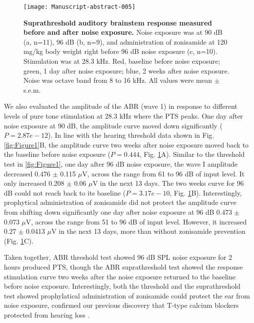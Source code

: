 \documentclass[11pt]{article}
\begin{document}
\begin{figure}[ht]
\centering
\texttt{[image: Manuscript-abstract-005]}

\caption{{\bf {Suprathreshold auditory brainstem response measured before and after noise exposure.}}  Noise exposure was at 90 dB (a, n=11), 96 dB (b, n=9), and administration of zonisamide at 120 mg/kg body weight right before 96 dB noise exposure (c, n=10). Stimulation was at 28.3 kHz.  Red, baseline before noise exposure; green, 1 day after noise exposure; blue, 2 weeks after noise exposure.  Noise was octave band from 8 to 16 kHz. All values were mean $\pm$ s.e.m.}
\label{fig:Figure2}
\end{figure}

We also evaluated the amplitude of the ABR (wave 1) in response to different levels of pure tone stimulation at 28.3 kHz where the PTS peaks. One day after noise exposure at 90 dB, the amplitude curve moved down significantly ($P=2.87e-12$). In line with the hearing threshold data shown in Fig. \ref{fig:Figure1}B, the amplitude curve two weeks after noise exposure moved back to the baseline before noise exposure 
($P=0.444$, Fig. \ref{fig:Figure2}A). Similar to the threshold test in \ref{fig:Figure1}, one day after 96 dB noise exposure, the wave I amplitude decreased 0.476 
$\pm$ 
0.115 $\mu$V, across the range from 61 to 96 dB of input level. It only increased 0.208 
$\pm$ 
0.06 $\mu$V in the next 13 days. The two weeks curve for 96 dB could not reach back to its baseline 
($P=3.17e-10$, Fig. \ref{fig:Figure2}B). Interestingly, prophytical administration of zonisamide did not protect the amplitude curve from shifting down significantly one day after noise exposure at 96 dB 0.473 
$\pm$ 
0.073 $\mu$V, across the range from 51 to 96 dB of input level. However, it increased 0.27 
$\pm$ 
0.0413 $\mu$V in the next 13 days, more than without zonisamide prevention (Fig. \ref{fig:Figure2}C).

Taken together, ABR threshold test showed 96 dB SPL noise exposure for 2 hours produced PTS, though the ABR suprathreshold test showed the response stimulation curve two weeks after the noise exposure returned to the baseline before noise exposure. Interestingly, both the threshold and the suprathreshold test showed prophylatical administration of zonisamide could protect the ear from noise exposure, confirmed our previous discovery that T-type calcium blockers protected from hearing loss \cite{Shen2007,Lei2011}.
\end{document}

